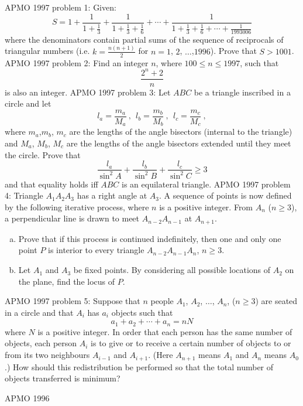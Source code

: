 APMO 1997 problem 1:  Given:
\[
S = 1 + \frac{1}{1 + \frac{1}{3}} + \frac{1}{1 + \frac{1}{3} + \frac{1} {6}} + \cdots + \frac{1}{1 + \frac{1}{3} + \frac{1}{6} + \cdots + \frac{1} {1993006}}
\]
where the denominators contain partial sums of the sequence of reciprocals of triangular numbers (i.e. $k=\frac{n(n+1)}{2}$ for $n = 1$, $2$, $\ldots$,$1996$).  Prove that $S>1001$. 
APMO 1997 problem 2:  Find an integer $n$, where $100 \leq n \leq 1997$, such that
\[ \frac{2^n+2}{n} \]
is also an integer. 
APMO 1997 problem 3:  Let $ABC$ be a triangle inscribed in a circle and let
\[ l_a = \frac{m_a}{M_a} \ , \ \ l_b = \frac{m_b}{M_b} \ , \ \ l_c = \frac{m_c}{M_c} \ , \]
where $m_a$,$m_b$, $m_c$ are the lengths of the angle bisectors (internal to the triangle) and $M_a$, $M_b$, $M_c$ are the lengths of the angle bisectors extended until they meet the circle.  Prove that
\[ \frac{l_a}{\sin^2 A} + \frac{l_b}{\sin^2 B} + \frac{l_c}{\sin^2 C} \geq 3 \]
and that equality holds iff $ABC$ is an equilateral triangle. 
APMO 1997 problem 4:  Triangle $A_1 A_2 A_3$ has a right angle at $A_3$. A sequence of points is now defined by the following iterative process, where $n$ is a positive integer. From $A_n$ ($n \geq 3$), a perpendicular line is drawn to meet $A_{n-2}A_{n-1}$ at $A_{n+1}$.
\begin{enumerate}[(a)]
  \item Prove that if this process is continued indefinitely, then one and only one point $P$ is interior to every triangle $A_{n-2} A_{n-1} A_n$, $n \geq 3$.
  \item Let $A_1$ and $A_3$ be fixed points. By considering all possible locations of $A_2$ on the plane, find the locus of $P$.
\end{enumerate} 
APMO 1997 problem 5:  Suppose that $n$ people $A_1$, $A_2$, $\ldots$, $A_n$, ($n \geq 3$) are seated in a circle and that $A_i$ has $a_i$ objects such that
\[ a_1 + a_2 + \cdots + a_n = nN \]
where $N$ is a positive integer. In order that each person has the same number of objects, each person $A_i$ is to give or to receive a certain number of objects to or from its two neighbours $A_{i-1}$ and $A_{i+1}$. (Here $A_{n+1}$ means $A_1$ and $A_n$ means $A_0$.)  How should this redistribution be performed so that the total number of objects transferred is minimum? 

APMO 1996 

